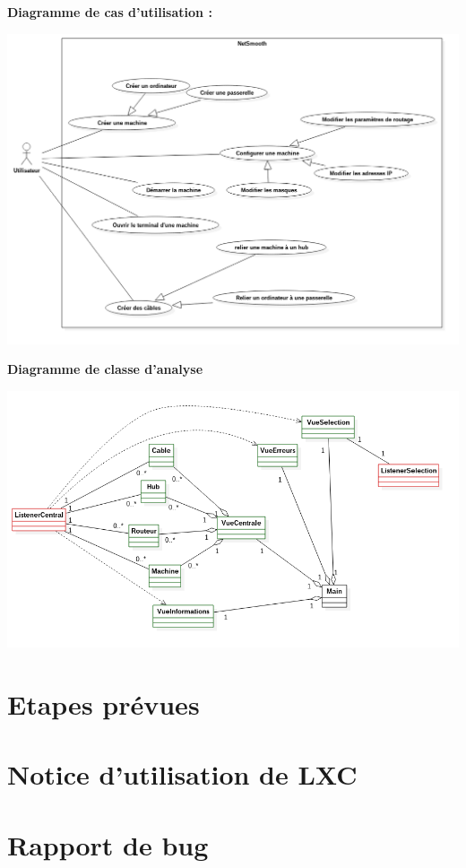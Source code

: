 \documentclass[a4paper]{article}
\begin{document}
\textbf{Diagramme de cas d'utilisation :}
\begin{center}
\includegraphics[scale=0.4]{usecase_diagram.PNG}
\end{center}

\newpage
\textbf{Diagramme de classe d'analyse}
\begin{center}
\includegraphics[scale=0.5]{diagramme_analyse.png}
\end{center}
\section{Etapes pr\'evues}


\section{Notice d'utilisation de LXC}

\section{Rapport de bug}
\end{document}
